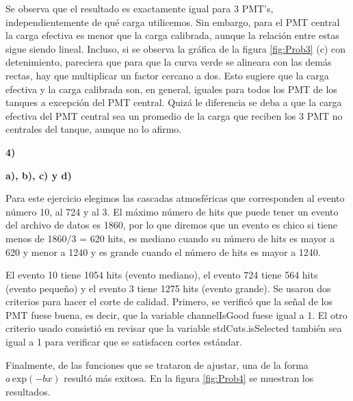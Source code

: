 \documentclass[11pt]{article}
\begin{document}
Se observa que el resultado es exactamente igual para 3 PMT's, independientemente de qué carga utilicemos. Sin embargo, para el PMT central la carga efectiva es menor que la carga calibrada, aunque la relación entre estas sigue siendo lineal. Incluso, si se observa la gráfica de la figura \ref{fig:Prob3} (c) con detenimiento, pareciera que para que la curva verde se alineara con las demás rectas, hay que multiplicar un factor cercano a dos. Esto sugiere que la carga efectiva y la carga calibrada son, en general, iguales para todos los PMT de los tanques a excepción del PMT central. Quizá le diferencia se deba a que la carga efectiva del PMT central sea un promedio de la carga que reciben los 3 PMT no centrales del tanque, aunque no lo afirmo. 
\pagebreak

\textbf{4)}

\textbf{a), b), c) y d)}

Para este ejercicio elegimos las cascadas atmosféricas que corresponden al evento número 10, al 724 y al 3. El máximo número de hits que puede tener un evento del archivo de datos es 1860, por lo que diremos que un evento es chico si tiene menos de 1860/3 = 620 hits, es mediano cuando su número de hits es mayor a 620 y menor a 1240 y es grande cuando el número de hits es mayor a 1240.

\hspace{5mm}El evento 10 tiene 1054 hits (evento mediano), el evento 724 tiene 564 hits (evento pequeño) y el evento 3 tiene 1275 hits (evento grande). Se usaron dos criterios para hacer el corte de calidad. Primero, se verificó que la señal de los PMT fuese buena, es decir, que la variable channelIsGood fuese igual a 1. El otro criterio usado consistió en revisar que la variable stdCuts.isSelected también sea igual a 1 para verificar que se satisfacen cortes estándar.

\hspace{5mm}Finalmente, de las funciones que se trataron de ajustar, una de la forma $a\,\textrm{exp}(-bx)$ resultó más exitosa. En la figura \ref{fig:Prob4} se muestran los resultados.
\end{document}
